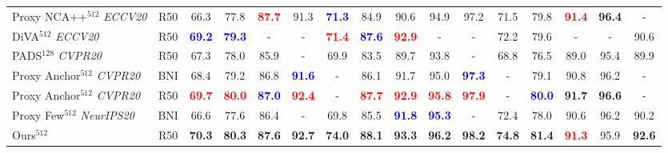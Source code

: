 \documentclass{article}
\begin{document}
\begin{table*}
{\begin{tabular}{@{}l|c|ccccc|ccccc|cccc@{}}
Proxy NCA++$^{512}$ \cite{DBLP:journals/corr/abs-2004-01113} \textit{ECCV20} & R50 & 66.3 & 77.8 & \textbf{\textcolor{red}{87.7}} & 91.3 & \textbf{\textcolor{blue}{71.3}} & 84.9 & 90.6 & 94.9 & 97.2 & 71.5 & 79.8 & \textbf{\textcolor{red}{91.4}} & \textbf{96.4} & - \\

DiVA$^{512}$ \cite{DBLP:conf/eccv/MilbichRBSBOC20} \textit{ECCV20} & R50 & \textbf{\textcolor{blue}{69.2}} & \textbf{\textcolor{blue}{79.3}} & - & - & \textbf{\textcolor{red}{71.4}} & \textbf{\textcolor{blue}{87.6}}  & \textbf{\textcolor{red}{92.9}} & - & - & 72.2 & 79.6 & - & - & 90.6 \\

PADS$^{128}$ \cite{DBLP:conf/cvpr/RothMO20} \textit{CVPR20} & R50 & 67.3  & 78.0  & 85.9 & - & 69.9 & 83.5 & 89.7 & 93.8 & - & 68.8 & 76.5  & 89.0 &  95.4 & 89.9 \\

Proxy Anchor$^{512}$ \cite{DBLP:conf/cvpr/KimKCK20} \textit{CVPR20} & BNI & 68.4 & 79.2 & 86.8 & \textbf{\textcolor{blue}{91.6}} & -  & 86.1 & 91.7 & 95.0 & \textbf{\textcolor{blue}{97.3}} & -  & 79.1 & 90.8 & 96.2 & - \\

Proxy Anchor$^{512}$ \cite{DBLP:conf/cvpr/KimKCK20} \textit{CVPR20} & R50 & \textbf{\textcolor{red}{69.7}} & \textbf{\textcolor{red}{80.0}} & \textbf{\textcolor{blue}{87.0}} & \textbf{\textcolor{red}{92.4}} & -  & \textbf{\textcolor{red}{87.7}} & \textbf{\textcolor{red}{92.9}} & \textbf{\textcolor{red}{95.8}} & \textbf{\textcolor{red}{97.9}} & -  & \textbf{\textcolor{blue}{80.0}} & \textbf{91.7} & \textbf{96.6} & - \\

Proxy Few$^{512}$ \cite{DBLP:journals/corr/abs-2010-13636} \textit{NeurIPS20} & BNI & 66.6 & 77.6 & 86.4 & - & 69.8 & 85.5 & \textbf{\textcolor{blue}{91.8}} & \textbf{\textcolor{blue}{95.3}} & - & 72.4 & 78.0 & 90.6 & 96.2 & 90.2 \\ \hline










Ours$^{512}$ & R50 & \textbf{70.3} & \textbf{80.3} & \textbf{87.6} & \textbf{92.7} & \textbf{74.0} & \textbf{88.1} & \textbf{93.3} & \textbf{96.2} & \textbf{98.2} & \textbf{74.8} & \textbf{81.4} & \textbf{\textcolor{red}{91.3}} & 95.9 & \textbf{92.6} \\ \hline




\end{tabular}}
\end{table*}
\end{document}
